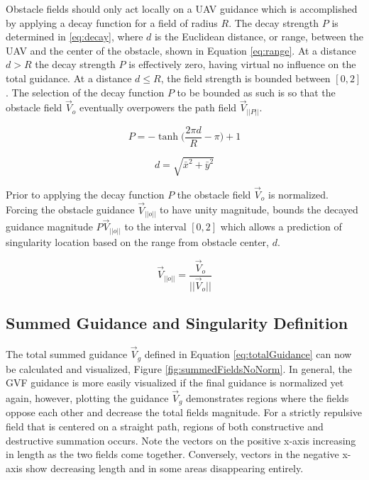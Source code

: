 \documentclass[numbered,pdftex]{ohio-etd}
\begin{document}
Obstacle fields should only act locally on a UAV guidance which is accomplished by applying a decay function for a field of radius $R$. The decay strength $P$ is determined in \ref{eq:decay}, where $d$ is the Euclidean distance, or range, between the UAV and the center of the obstacle, shown in Equation \ref{eq:range}. At a distance $d>R$ the decay strength $P$ is effectively zero, having virtual no influence on the total guidance. At a distance $d\leq R$, the field strength is bounded between $[0,2]$. The selection of the decay function $P$ to be bounded as such is so that the obstacle field $\overrightarrow{V}_o$ eventually overpowers the path field $\overrightarrow{V}_{||P||}$. 


\begin{equation}
\label{eq:decay}
P = -\tanh \bigg( \frac{2\pi d}{R}-\pi\bigg)+1
\end{equation}

\begin{equation}
\label{eq:range}
d = \sqrt{ \bar{x}^2+\bar{y}^2}
\end{equation}


Prior to applying the decay function $P$ the obstacle field $\overrightarrow{V}_o$ is normalized. Forcing the obstacle guidance $\overrightarrow{V}_{||o||}$ to have unity magnitude, bounds the decayed guidance magnitude $P\overrightarrow{V}_{||o||}$ to the interval $[0,2]$ which allows a prediction of singularity location based on the range from obstacle center, $d$.


\begin{equation}
\overrightarrow{V}_{||o||} = \frac{\overrightarrow{V}_{o}}{||\overrightarrow{V}_{o}||}
\label{eq:obstNormalized}
\end{equation}


\subsection{Summed Guidance and Singularity Definition}
The total summed guidance $\overrightarrow{V}_g$ defined in Equation \ref{eq:totalGuidance} can now be calculated and visualized, Figure \ref{fig:summedFieldsNoNorm}. In general, the GVF guidance is more easily visualized if the final guidance is normalized yet again, however, plotting the guidance $\overrightarrow{V}_g$ demonstrates regions where the fields oppose each other and decrease the total fields magnitude. For a strictly repulsive field that is centered on a straight path, regions of both constructive and destructive summation occurs. Note the vectors on the positive x-axis increasing in length as the two fields come together. Conversely, vectors in the negative x-axis show decreasing length and in some areas disappearing entirely.  
\end{document}
